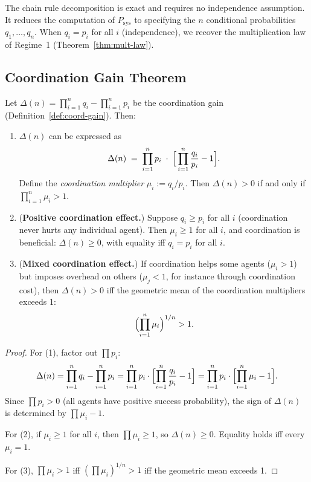 \begin{remark}
The chain rule decomposition is exact and requires no independence assumption. It reduces the
computation of $P_{\mathrm{sys}}$ to specifying the $n$ conditional probabilities $q_1, \ldots, q_n$.
When $q_i = p_i$ for all $i$ (independence), we recover the multiplication law of Regime~1
(Theorem~\ref{thm:mult-law}).
\end{remark}

\subsection{Coordination Gain Theorem}

\begin{theorem}
\label{thm:coord-gain}
Let $\Delta(n) = \prod_{i=1}^{n} q_i - \prod_{i=1}^{n} p_i$ be the coordination gain
(Definition~\ref{def:coord-gain}). Then:
\begin{enumerate}
  \item $\Delta(n)$ can be expressed as
  \[
    \Delta(n) \;=\; \prod_{i=1}^{n} p_i \;\cdot\; \Bigl[\,\prod_{i=1}^{n} \frac{q_i}{p_i} - 1\Bigr].
  \]
  Define the \emph{coordination multiplier} $\mu_i := q_i / p_i$. Then
  $\Delta(n) > 0$ if and only if $\prod_{i=1}^{n} \mu_i > 1$.

  \item (\textbf{Positive coordination effect.}) Suppose $q_i \geq p_i$ for all $i$
  (coordination never hurts any individual agent). Then $\mu_i \geq 1$ for all $i$, and
  coordination is beneficial: $\Delta(n) \geq 0$, with equality iff $q_i = p_i$ for all $i$.

  \item (\textbf{Mixed coordination effect.}) If coordination helps some agents ($\mu_i > 1$)
  but imposes overhead on others ($\mu_j < 1$, for instance through coordination cost),
  then $\Delta(n) > 0$ iff the geometric mean of the coordination multipliers exceeds 1:
  \[
    \Bigl(\prod_{i=1}^{n} \mu_i\Bigr)^{1/n} > 1.
  \]
\end{enumerate}
\end{theorem}

\begin{proof}
For (1), factor out $\prod p_i$:
\[
  \Delta(n) = \prod_{i=1}^{n} q_i - \prod_{i=1}^{n} p_i
  = \prod_{i=1}^{n} p_i \cdot \Bigl[\prod_{i=1}^{n} \frac{q_i}{p_i} - 1\Bigr]
  = \prod_{i=1}^{n} p_i \cdot \Bigl[\prod_{i=1}^{n} \mu_i - 1\Bigr].
\]
Since $\prod p_i > 0$ (all agents have positive success probability), the sign of $\Delta(n)$
is determined by $\prod \mu_i - 1$.

For (2), if $\mu_i \geq 1$ for all $i$, then $\prod \mu_i \geq 1$, so $\Delta(n) \geq 0$.
Equality holds iff every $\mu_i = 1$.

For (3), $\prod \mu_i > 1$ iff $(\prod \mu_i)^{1/n} > 1$ iff the geometric mean exceeds 1.
\end{proof}


